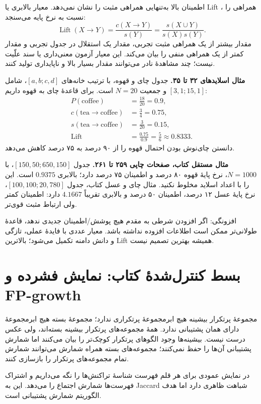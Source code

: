 اطمینان بالا به‌تنهایی همراهی مثبت را نشان نمی‌دهد. معیار بالابری یا Lift ، همراهی را نسبت به نرخ پایه می‌سنجد:
\[\operatorname{Lift}(X\to Y)=\frac{c(X\to Y)}{s(Y)}=\frac{s(X\cup Y)}{s(X)s(Y)}.\]
مقدار بیشتر از یک همراهی مثبت تجربی، مقدار یک استقلال در جدول تجربی و مقدار کمتر از یک همراهی منفی را بیان می‌کند. این معیار آزمون معنی‌داری یا سند علّیت نیست؛ چند مشاهدهٔ نادر می‌توانند مقدار بسیار بالا و ناپایداری تولید کنند.

\textbf{مثال اسلایدهای ۳۲ تا ۳۵.} جدول چای و قهوه، با ترتیب خانه‌های $[a,b;c,d]$، شامل $[3,1;15,1]$ و جمعیت $N=20$ است. برای قاعدهٔ چای به قهوه داریم:
\begin{align*}
P(\mathrm{coffee})&=\frac{18}{20}=0.9,\\
c(\mathrm{tea}\to\mathrm{coffee})&=\frac34=0.75,\\
s(\mathrm{tea}\to\mathrm{coffee})&=\frac3{20}=0.15,\\
\operatorname{Lift}&=\frac{0.75}{0.9}=\frac56\approx0.8333.
\end{align*}
دانستن چای‌نوش بودن احتمال قهوه را از ۹۰ درصد به ۷۵ درصد کاهش می‌دهد.

\textbf{مثال مستقل کتاب، صفحات چاپی ۲۵۹ تا ۲۶۱.} جدول $[150,50;650,150]$، با $N=1000$، نرخ پایهٔ قهوه ۸۰ درصد و اطمینان ۷۵ درصد دارد؛ بالابری $0.9375$ است. این را با اعداد اسلاید مخلوط نکنید. مثال چای و عسل کتاب، جدول $[100,100;20,780]$، نرخ پایهٔ عسل ۱۲ درصد، اطمینان ۵۰ درصد و بالابری تقریباً $4.1667$ دارد: اطمینان کمتر ولی ارتباط مثبت قوی‌تر.

افزونگی: اگر افزودن شرطی به مقدم هیچ پوشش/اطمینان جدیدی ندهد، قاعدهٔ طولانی‌تر ممکن است اطلاعات افزوده نداشته باشد. معیار عددی با فایدهٔ عملی، تازگی و دانش دامنه تکمیل می‌شود؛ بالاترین Lift همیشه بهترین تصمیم نیست.

\section{بسط کنترل‌شدهٔ کتاب: نمایش فشرده و FP-growth}

مجموعهٔ پرتکرار بیشینه هیچ ابرمجموعهٔ پرتکراری ندارد؛ مجموعهٔ بسته هیچ ابرمجموعهٔ دارای همان پشتیبانی ندارد. همهٔ مجموعه‌های پرتکرار بیشینه بسته‌اند، ولی عکس درست نیست. بیشینه‌ها وجود الگوهای پرتکرار کوچک‌تر را بیان می‌کنند اما شمارش پشتیبانی آن‌ها را حفظ نمی‌کنند؛ مجموعه‌های بسته همراه شمارش می‌توانند شمارش تمام مجموعه‌های پرتکرار را بازسازی کنند.

در نمایش عمودی برای هر قلم فهرست شناسهٔ تراکنش‌ها را نگه می‌داریم و اشتراک فهرست‌ها شمارش اجتماع را می‌دهد. این به Jaccard شباهت ظاهری دارد اما هدف الگوریتم شمارش پشتیبانی است.

